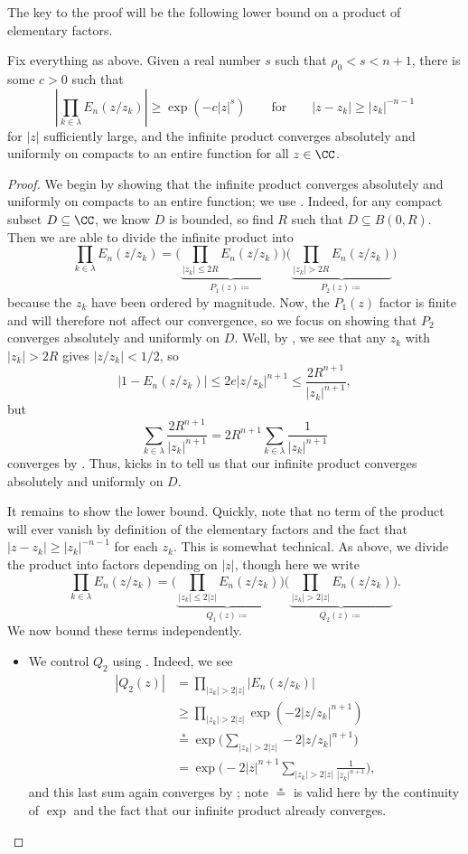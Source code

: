 \documentclass[notes.tex]{subfiles}
\begin{document}
The key to the proof will be the following lower bound on a product of elementary factors.
\begin{lemma} \label{lem:elem-factor-prod-lower-bound}
	Fix everything as above. Given a real number $s$ such that $\rho_0<s<n+1$, there is some $c>0$ such that
	\[\left|\prod_{k\in\lambda}E_n(z/z_k)\right|\ge\exp\left(-c|z|^s\right)\qquad\text{for}\qquad|z-z_k|\ge|z_k|^{-n-1}\]
	for $|z|$ sufficiently large, and the infinite product converges absolutely and uniformly on compacts to an entire function for all $z\in\CC$.
\end{lemma}
\begin{proof}
	We begin by showing that the infinite product converges absolutely and uniformly on compacts to an entire function; we use . Indeed, for any compact subset $D\subseteq\CC$, we know $D$ is bounded, so find $R$ such that $D\subseteq B(0,R)$. Then we are able to divide the infinite product into
	\[\prod_{k\in\lambda} E_n(z/z_k)=\Bigg(\underbrace{\prod_{|z_k|\le2R}E_n(z/z_k)}_{P_1(z)\coloneqq}\Bigg)\Bigg(\underbrace{\prod_{|z_k|>2R}E_n(z/z_k)}_{P_2(z)\coloneqq}\Bigg)\]
	because the $z_k$ have been ordered by magnitude. Now, the $P_1(z)$ factor is finite and will therefore not affect our convergence, so we focus on showing that $P_2$ converges absolutely and uniformly on $D$. Well, by , we see that any $z_k$ with $|z_k|>2R$ gives $|z/z_k|<1/2$, so
	\[|1-E_n(z/z_k)|\le2e|z/z_k|^{n+1}\le\frac{2R^{n+1}}{|z_k|^{n+1}},\]
	but
	\[\sum_{k\in\lambda}\frac{2R^{n+1}}{|z_k|^{n+1}}=2R^{n+1}\sum_{k\in\lambda}\frac1{|z_k|^{n+1}}\]
	converges by . Thus,  kicks in to tell us that our infinite product converges absolutely and uniformly on $D$.

	It remains to show the lower bound. Quickly, note that no term of the product will ever vanish by definition of the elementary factors and the fact that $|z-z_k|\ge|z_k|^{-n-1}$ for each $z_k$. This is somewhat technical. As above, we divide the product into factors depending on $|z|$, though here we write
	\[\prod_{k\in\lambda} E_n(z/z_k)=\Bigg(\underbrace{\prod_{|z_k|\le2|z|}E_n(z/z_k)}_{Q_1(z)\coloneqq}\Bigg)\Bigg(\underbrace{\prod_{|z_k|>2|z|}E_n(z/z_k)}_{Q_2(z)\coloneqq}\Bigg).\]
	We now bound these terms independently.
	\begin{itemize}
		\item We control $Q_2$ using . Indeed, we see
		\begin{align*}
			|Q_2(z)| &= \prod_{|z_k|>2|z|}|E_n(z/z_k)| \\
			&\ge \prod_{|z_k|>2|z|}\exp\left(-2|z/z_k|^{n+1}\right) \\
			&\stackrel*= \exp\Bigg(\sum_{|z_k|>2|z|}-2|z/z_k|^{n+1}\Bigg) \\
			&= \exp\Bigg(-2|z|^{n+1}\sum_{|z_k|>2|z|}\frac1{|z_k|^{n+1}}\Bigg),
		\end{align*}
		and this last sum again converges by ; note $\stackrel*=$ is valid here by the continuity of $\exp$ and the fact that our infinite product already converges.


\end{itemize}
\end{proof}
\end{document}
